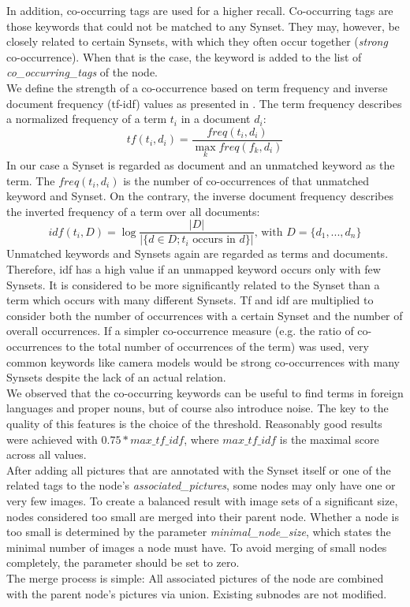 In addition, co-occurring tags are used for a higher recall. Co-occurring tags are those keywords that could not be matched to any Synset. They may, however, be closely related to certain Synsets, with which they often occur together (\emph{strong} co-occurrence). When that is the case, the keyword is added to the list of \emph{co\_occurring\_tags} of the node. \\
We define the strength of a co-occurrence based on term frequency and inverse document frequency (tf-idf)  values as presented in \cite{baeza1999modern}. The term frequency describes a normalized frequency of a term $t_i$ in a document $d_i$:
\[tf(t_i,d_i) = \frac{freq(t_i,d_i)}{\max_k freq(f_k,d_i)}\]
In our case a Synset is regarded as document and an unmatched keyword as the term. The $freq(t_i,d_i)$ is the number of co-occurrences of that unmatched keyword and Synset. On the contrary, the inverse document frequency describes the inverted frequency of a term over all documents:
\[idf(t_i, D) = \log \frac{\vert D\vert}{\vert \{d \in D; t_i \text{ occurs in }d\}\vert} \text{, with } D = \{d_1,..., d_n\}\]
Unmatched keywords and Synsets again are regarded as terms and documents. Therefore, idf has a high value if an unmapped keyword occurs only with few Synsets. It is considered to be more significantly related to the Synset than a term which occurs with many different Synsets. Tf and idf are multiplied to consider both the number of occurrences with a certain Synset and the number of overall occurrences.
If a simpler co-occurrence measure (e.g. the ratio of co-occurrences to the total number of occurrences of the term) was used, very common keywords like camera models would be strong co-occurrences with many Synsets despite the lack of an actual relation. \\
We observed that the co-occurring keywords can be useful to find terms in foreign languages and proper nouns, but of course also introduce noise. The key to the quality of this features is the choice of the threshold. Reasonably good results were achieved with $0.75 * max\_tf\_idf$, where $max\_tf\_idf$ is the maximal score across all values. \\

After adding all pictures that are annotated with the Synset itself or one of the related tags to the node's \emph{associated\_pictures}, some nodes may only have one or very few images. To create a balanced result with image sets of a significant size, nodes considered too small are merged into their parent node. Whether a node is too small is determined by the parameter \emph{minimal\_node\_size}, which states the minimal number of images a node must have. To avoid merging of small nodes completely, the parameter should be set to zero.\\
The merge process is simple: All associated pictures of the node are combined with the parent node's pictures via union. Existing subnodes are not modified.

